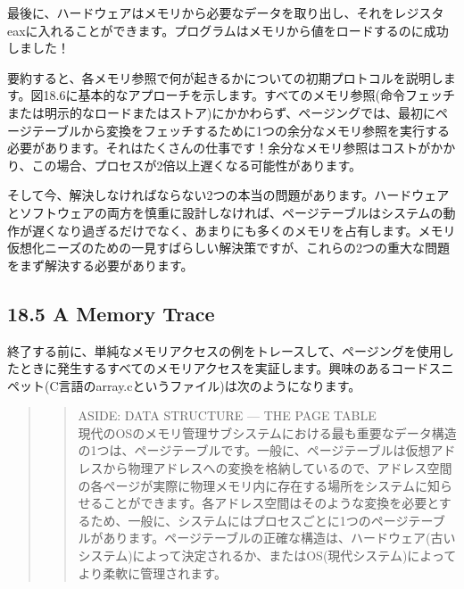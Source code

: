 最後に、ハードウェアはメモリから必要なデータを取り出し、それをレジスタeaxに入れることができます。プログラムはメモリから値をロードするのに成功しました！

要約すると、各メモリ参照で何が起きるかについての初期プロトコルを説明します。図18.6に基本的なアプローチを示します。すべてのメモリ参照(命令フェッチまたは明示的なロードまたはストア)にかかわらず、ページングでは、最初にページテーブルから変換をフェッチするために1つの余分なメモリ参照を実行する必要があります。それはたくさんの仕事です！余分なメモリ参照はコストがかかり、この場合、プロセスが2倍以上遅くなる可能性があります。

そして今、解決しなければならない2つの本当の問題があります。ハードウェアとソフトウェアの両方を慎重に設計しなければ、ページテーブルはシステムの動作が遅くなり過ぎるだけでなく、あまりにも多くのメモリを占有します。メモリ仮想化ニーズのための一見すばらしい解決策ですが、これらの2つの重大な問題をまず解決する必要があります。

\hypertarget{a-memory-trace}{%
\subsection*{18.5 A Memory Trace}\label{a-memory-trace}}

終了する前に、単純なメモリアクセスの例をトレースして、ページングを使用したときに発生するすべてのメモリアクセスを実証します。興味のあるコードスニペット(C言語のarray.cというファイル)は次のようになります。

\begin{Shaded}
\begin{Highlighting}[]
\NormalTok{ array[}\NormalTok{];}
\NormalTok{;}
\end{Highlighting}
\end{Shaded}

\begin{quote}
\begin{quote}
ASIDE: DATA STRUCTURE --- THE PAGE TABLE\\
現代のOSのメモリ管理サブシステムにおける最も重要なデータ構造の1つは、ページテーブルです。一般に、ページテーブルは仮想アドレスから物理アドレスへの変換を格納しているので、アドレス空間の各ページが実際に物理メモリ内に存在する場所をシステムに知らせることができます。各アドレス空間はそのような変換を必要とするため、一般に、システムにはプロセスごとに1つのページテーブルがあります。ページテーブルの正確な構造は、ハードウェア(古いシステム)によって決定されるか、またはOS(現代システム)によってより柔軟に管理されます。
\end{quote}
\end{quote}

